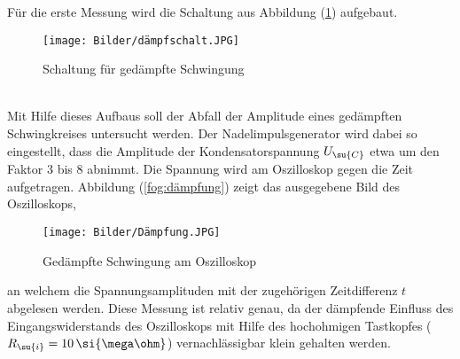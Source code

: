 Für die erste Messung wird die Schaltung aus Abbildung (\ref{fig:schlt1})
aufgebaut.
\begin{figure}[h]
  \centering
  \texttt{[image: Bilder/dämpfschalt.JPG]}
  \caption{Schaltung für gedämpfte Schwingung}
  \label{fig:schlt1}
\end{figure} \\
Mit Hilfe dieses Aufbaus soll der Abfall der Amplitude eines gedämpften
Schwingkreises untersucht werden. Der Nadelimpulsgenerator wird dabei so
eingestellt, dass die Amplitude der Kondensatorspannung $U_\su{C}$ etwa um
den Faktor 3 bis 8 abnimmt. Die Spannung wird am Oszilloskop gegen die Zeit
aufgetragen.
Abbildung (\ref{fog:dämpfung}) zeigt das ausgegebene Bild des Oszilloskops,
\begin{figure} %
  \centering
  \texttt{[image: Bilder/Dämpfung.JPG]}
  \caption{Gedämpfte Schwingung am Oszilloskop}
  \label{fig:dämpfung}
\end{figure}
an welchem die Spannungsamplituden mit der zugehörigen Zeitdifferenz $t$
abgelesen werden. Diese Messung ist relativ genau, da der dämpfende Einfluss
des Eingangswiderstands des Oszilloskops mit Hilfe des hochohmigen Tastkopfes
($R_\su{i}=10\,\si{\mega\ohm}$) vernachlässigbar klein gehalten werden.
